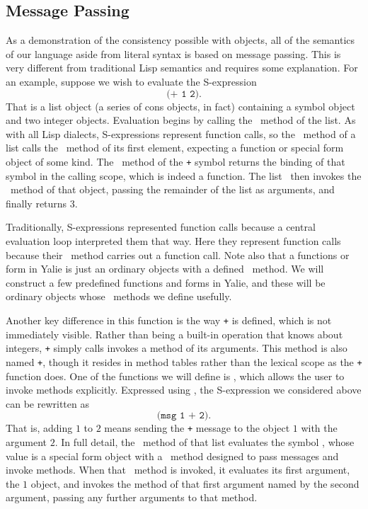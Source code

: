 \documentclass[twocolumn]{article}
\begin{document}
\subsection*{Message Passing}
As a demonstration of the consistency possible with objects, all of
the semantics of our language aside from literal syntax is based on
message passing. This is very different from traditional Lisp
semantics and requires some explanation. For an example, suppose we
wish to evaluate the S-expression
\[ \texttt{(+ 1 2)}. \] That is a list object (a series of cons
objects, in fact) containing a symbol object and two integer
objects. Evaluation begins by calling the \eval\ method of the list. As
with all Lisp dialects, S-expressions represent function calls, so the
\eval\ method of a list calls the \eval\ method of its first element,
expecting a function or special form object of some kind. The \eval\
method of the \texttt{+} symbol returns the binding of that symbol in
the calling scope, which is indeed a function. The list \eval\ then
invokes the \call\ method of that object, passing the remainder of the
list as arguments, and finally returns $3$.

Traditionally, S-expressions represented function calls because a
central evaluation loop interpreted them that way. Here they represent
function calls because their \eval\ method carries out a function
call. Note also that a functions or form in Yalie is just an ordinary
objects with a defined \call\ method. We will construct a few
predefined functions and forms in Yalie, and these will be ordinary
objects whose \call\ methods we define usefully.

Another key difference in this function is the way \texttt{+} is
defined, which is not immediately visible. Rather than being a
built-in operation that knows about integers, \texttt{+} simply calls
invokes a method of its arguments. This method is also named
\texttt{+}, though it resides in method tables rather than the lexical
scope as the \texttt{+} function does. One of the functions we will
define is \msg, which allows the user to invoke methods
explicitly. Expressed using \msg, the S-expression we considered above
can be rewritten as
\[\texttt{(msg 1 + 2)}.\]
That is, adding $1$ to $2$ means sending the \texttt{+} message to the
object $1$ with the argument $2$. In full detail, the \eval\ method of
that list evaluates the symbol \msg, whose value is a special form
object with a \call\ method designed to pass messages and invoke
methods. When that \call\ method is invoked, it evaluates its first
argument, the $1$ object, and invokes the method of that first
argument named by the second argument, passing any further arguments
to that method.
\end{document}
